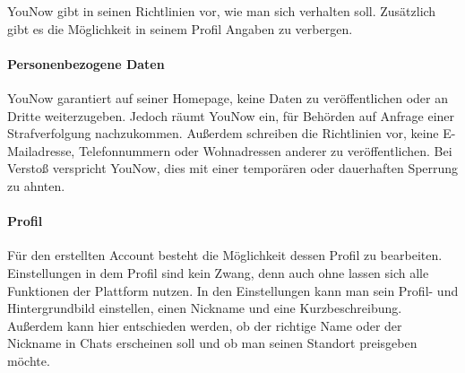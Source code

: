 YouNow gibt in seinen Richtlinien vor, wie man sich verhalten soll. Zusätzlich gibt es die Möglichkeit in seinem Profil Angaben zu verbergen.

\paragraph{Personenbezogene Daten}
YouNow garantiert auf seiner Homepage, keine Daten zu veröffentlichen oder an Dritte weiterzugeben. Jedoch räumt YouNow ein, für Behörden auf Anfrage einer Strafverfolgung nachzukommen. Außerdem schreiben die Richtlinien vor, keine E-Mailadresse, Telefonnummern oder Wohnadressen anderer zu veröffentlichen. Bei Verstoß verspricht YouNow, dies mit einer temporären oder dauerhaften Sperrung zu ahnten.  

\paragraph{Profil}
Für den erstellten Account besteht die Möglichkeit dessen Profil zu bearbeiten. Einstellungen in dem Profil sind kein Zwang, denn auch ohne lassen sich alle Funktionen der Plattform nutzen. In den Einstellungen kann man sein Profil- und Hintergrundbild einstellen, einen Nickname und eine Kurzbeschreibung. Außerdem kann hier entschieden werden, ob der richtige Name oder der Nickname in Chats erscheinen soll und ob man seinen Standort preisgeben möchte.


